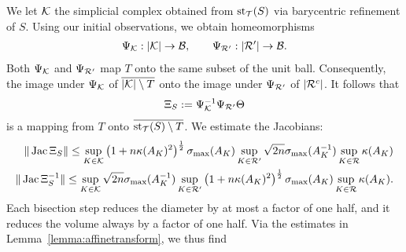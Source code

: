 \documentclass[a4paper]{article}
\begin{document}
        We let ${\mathcal K}$ the simplicial complex obtained from $\operatorname{st}_{{\mathcal T}}(S)$ via barycentric refinement of $S$. 
        Using our initial observations, we obtain homeomorphisms 
        \begin{align*}
            \Psi_{{\mathcal K} } : |{\mathcal K}| \rightarrow {\mathcal B},
            \qquad 
            \Psi_{{\mathcal R}'} : |{\mathcal R}'| \rightarrow {\mathcal B}.
        \end{align*}
        Both $\Psi_{{\mathcal K}}$ and $\Psi_{{\mathcal R}'}$ map $T$ onto the same subset of the unit ball.
        Consequently, the image under $\Psi_{{\mathcal K}}$ of $\overline{|{\mathcal K}| \setminus T}$
        onto the image under $\Psi_{{\mathcal R}'}$ of $|{\mathcal R}^{c}|$.
        It follows that 
        \begin{align*}
            \Xi_{S} := \Psi_{{\mathcal K}}^{-1} \Psi_{{\mathcal R}'} \Theta
        \end{align*}
        is a mapping from $T$ onto $\overline{\operatorname{st}_{{\mathcal T}}(S) \setminus T}$.
        We estimate the Jacobians: 
        \begin{align*}
            \| \operatorname{{\rm Jac}} \Xi_{S} \| 
            \leq 
            \sup_{ K \in {\mathcal K}  }
            \left( 1 + n \kappa(A_{K})^{2} \right)^{\frac 1 2}
            \sigma_{\max}(A_{K}) 
            \sup_{ K \in {\mathcal R}' } 
            \sqrt{2n} 
            \sigma_{\max}(A_{K}^{-1}) 
            \sup_{ K \in {\mathcal R}  } \kappa(A_{K})
            \\
            \| \operatorname{{\rm Jac}} \Xi_{S}^{-1} \| 
            \leq 
            \sup_{ K \in {\mathcal K}  }
            \sqrt{2n} 
            \sigma_{\max}(A_{K}^{-1}) 
            \sup_{ K \in {\mathcal R}' } 
            \left( 1 + n \kappa(A_{K})^{2} \right)^{\frac 1 2}
            \sigma_{\max}(A_{K}) 
            \sup_{ K \in {\mathcal R}  } \kappa(A_{K})
            .
        \end{align*}
        \color{red}
        Each bisection step reduces the diameter by at most a factor of one half,
        and it reduces the volume always by a factor of one half. 
        Via the estimates in Lemma~\ref{lemma:affinetransform}, we thus find 
\end{document}
